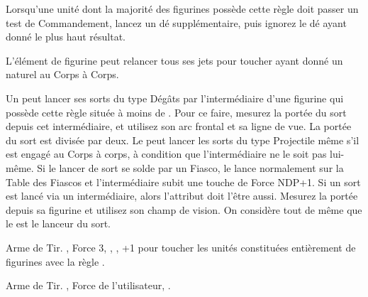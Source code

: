 \newcommand{\QRSnote}{%
\noindent\refsymbol{} Un membre d'équipage de moins quand il sert de monture.
}











\startarmyspecialrules

\armyspecialruleentry{\coldblooded}

Lorsqu'une unité dont la majorité des figurines possède cette règle doit passer un test de Commandement, lancez un dé supplémentaire, puis ignorez le dé ayant donné le plus haut résultat.

\armyspecialruleentry{\bornpredator}

L'élément de figurine peut relancer tous ses jets pour toucher ayant donné un  naturel au Corps à Corps.

\armyspecialruleentry{\telepathiclink}

Un \cuatllord{} peut lancer ses sorts du type Dégâts par l'intermédiaire d'une figurine qui possède cette règle située à moins de . Pour ce faire, mesurez la portée du sort depuis cet intermédiaire, et utilisez son arc frontal et sa ligne de vue. La portée du sort est divisée par deux. Le \cuatllord{} peut lancer les sorts du type Projectile même s'il est engagé au Corps à corps, à condition que l'intermédiaire ne le soit pas lui-même. Si le lancer de sort se solde par un Fiasco, le \cuatllord{} lance normalement sur la Table des Fiascos et l'intermédiaire subit une touche de Force NDP+1. Si un sort est lancé via un intermédiaire, alors l'attribut doit l'être aussi. Mesurez la portée depuis sa figurine et utilisez son champ de vision. On considère tout de même que le \cuatllord{} est le lanceur du sort.

\closearmyspecialrules






\vspace{1.5cm}
\startarmyarmoury

\startitemlistonecol

\listitemonecol{\blowpipe} Arme de Tir. , Force 3, \poisonedattacks{}, , +1 pour toucher les unités constituées entièrement de figurines avec la règle \largetarget{}.

\listitemonecol{\javelin} Arme de Tir. , Force de l'utilisateur, \quicktofire{}.

